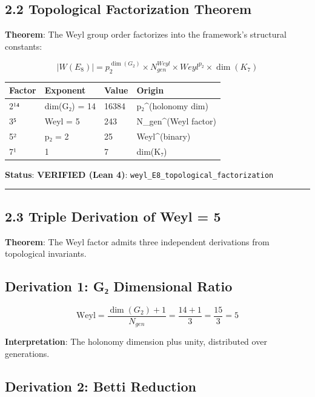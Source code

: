 \documentclass[11pt,a4paper]{article}
\begin{document}
\subsection{2.2 Topological Factorization Theorem}\label{topological-factorization-theorem}

\textbf{Theorem}: The Weyl group order factorizes into the framework's structural constants:

\[|W(E_8)| = p_2^{\dim(G_2)} \times N_{gen}^{Weyl} \times Weyl^{p_2} \times \dim(K_7)\]

\begin{longtable}[]{@{}llll@{}}
\toprule\noalign{}
Factor & Exponent & Value & Origin \\
\midrule\noalign{}
\endhead
\bottomrule\noalign{}
\endlastfoot
2¹⁴ & dim(G₂) = 14 & 16384 & p₂\^{}(holonomy dim) \\
3⁵ & Weyl = 5 & 243 & N\_\allowbreak{}gen\^{}(Weyl factor) \\
5² & p₂ = 2 & 25 & Weyl\^{}(binary) \\
7¹ & 1 & 7 & dim(K₇) \\
\end{longtable}

\textbf{Status}: \textbf{VERIFIED (Lean 4)}: \texttt{weyl\_\allowbreak{}E8\_\allowbreak{}topological\_\allowbreak{}factorization}

\begin{center}\rule{\linewidth}{0.5pt}\end{center}

\subsection{2.3 Triple Derivation of Weyl = 5}\label{triple-derivation-of-weyl-5}

\textbf{Theorem}: The Weyl factor admits three independent derivations from topological invariants.

\subsection{Derivation 1: G₂ Dimensional Ratio}\label{derivation-1-gux2082-dimensional-ratio}

\[\text{Weyl} = \frac{\dim(G_2) + 1}{N_{gen}} = \frac{14 + 1}{3} = \frac{15}{3} = 5\]

\textbf{Interpretation}: The holonomy dimension plus unity, distributed over generations.

\subsection{Derivation 2: Betti Reduction}\label{derivation-2-betti-reduction}
\end{document}

